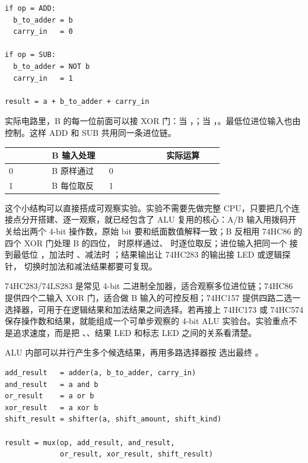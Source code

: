 \begin{lstlisting}
if op = ADD:
  b_to_adder = b
  carry_in   = 0

if op = SUB:
  b_to_adder = NOT b
  carry_in   = 1

result = a + b_to_adder + carry_in
\end{lstlisting}

实际电路里，B 的每一位前面可以接 XOR 门：当 ，；当 ，。最低位进位输入也由  控制。这样 ADD 和 SUB 共用同一条进位链。

\begin{longtable}{L{0.18\linewidth}L{0.24\linewidth}L{0.24\linewidth}L{0.24\linewidth}}
\toprule
{} & B 输入处理 &  & 实际运算 \\
 & B 原样通过 & 0 &  \\
1 & B 每位取反 & 1 &  \\
\bottomrule
\end{longtable}

这个小结构可以直接搭成可观察实验。实验不需要先做完整 CPU，只要把几个连接点分开搭建、逐一观察，就已经包含了 ALU 复用的核心：A/B 输入用拨码开关给出两个 4-bit 操作数，原始 bit 要和纸面数值解释一致；B 反相用 74HC86 的四个 XOR 门处理 B 的四位， 时原样通过、 时逐位取反；进位输入把同一个  接到最低位 ，加法时 、减法时 ；结果输出让 74HC283 的输出接 LED 或逻辑探针， 切换时加法和减法结果都要可复现。

\begin{chipcase}
74HC283/74LS283 是常见 4-bit 二进制全加器，适合观察多位进位链；74HC86 提供四个二输入 XOR 门，适合做 B 输入的可控反相；74HC157 提供四路二选一选择器，可用于在逻辑结果和加法结果之间选择。若再接上 74HC173 或 74HC574 保存操作数和结果，就能组成一个可单步观察的 4-bit ALU 实验台。实验重点不是追求速度，而是把 、、结果 LED 和标志 LED 之间的关系看清楚。
\end{chipcase}

ALU 内部可以并行产生多个候选结果，再用多路选择器按  选出最终 。

\begin{lstlisting}
add_result   = adder(a, b_to_adder, carry_in)
and_result   = a and b
or_result    = a or b
xor_result   = a xor b
shift_result = shifter(a, shift_amount, shift_kind)

result = mux(op, add_result, and_result,
             or_result, xor_result, shift_result)
\end{lstlisting}

